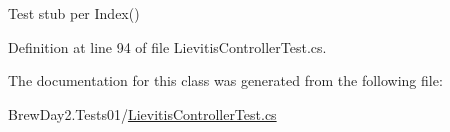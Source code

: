 Test stub per Index()



Definition at line 94 of file Lievitis\+Controller\+Test.\+cs.



The documentation for this class was generated from the following file\+:\begin{DoxyCompactItemize}
\item 
Brew\+Day2.\+Tests01/\mbox{\hyperlink{1_2_lievitis_controller_test_8cs}{Lievitis\+Controller\+Test.\+cs}}\end{DoxyCompactItemize}
